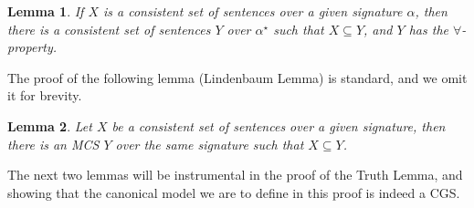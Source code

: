 \documentclass{article}
\newtheorem{lemma}{Lemma}
\begin{document}
\begin{lemma}\label{lemma:expConst}
    If $X$ is a consistent set of sentences over a given signature $\alpha$, then there is a consistent set of sentences $Y$ over $\alpha^\star$ such that $X\subseteq Y$, and $Y$ has the $\forall$-property.  
\end{lemma}
\iffalse
\begin{proof}
    Let $E$ be an enumeration of sentences of the form $\forall x \varphi$ over $\alpha^\star$. We define a sequence of sets of sentences $Y_0,Y_1,\ldots$ with $Y_0=X$ and $Y_{n+1}=Y_n \cup \set{ \varphi[a/x]\to \forall x \varphi}$ where $\forall x \varphi$ is the $n+1$-th sentence in $E$, and $a$ is the first constant in the enumeration occurring neither in $Y_n$ nor in $\varphi$. Since $Y_0$ is over $\alpha$, $Y_n$ is obtained by the addition of $n$ sentences over $\alpha^\star$, and $\alpha^\star$ includes a countably infinite set of new constants, we can always find such an $a$. 
    
    Now we show that $Y_{n+1}$ constructed in the described way is consistent. For this, assume towards a contradiction that $Y_n$ is consistent and $Y_{n+1}$ is not. This means that there is a finite set of sentences $U\subseteq Y_n$ such that $U\cup \set{\varphi [a/x]\to \forall x \varphi}\vdash \bot$. By the rules of $\CSL$ we thus obtain that (i) $U\vdash \varphi [a/x]$ and (ii) $U\vdash \neg \forall x \varphi$. Since $a$ does not appear in $Y_n$, we can use the  $\mathsf{Gen}$ rule of inference and conclude that $U\vdash \forall x \varphi$. In conjunction with (ii) this amounts to the fact that $Y_n$ is not consistent, and hence we arrive at a contradiction.
    
    Define $Y$ as $\bigcup_{n\in \mathbb{N} }Y_n$. It is now easy to see that $Y$ is consistent and has the $\forall$-property. 
\end{proof}
\fi

The proof of the following lemma (Lindenbaum Lemma) is standard, and we omit it for brevity.


\begin{lemma}
\label{lemma:mcs}
Let $X$ be a consistent set of sentences 
over a given signature, then there is %
an MCS $Y$ over the same signature such that $X\subseteq Y$.
\end{lemma}

The next two lemmas will be instrumental in the proof of the Truth Lemma, and showing that the canonical model we are to define in this proof is indeed a CGS. 
\end{document}
